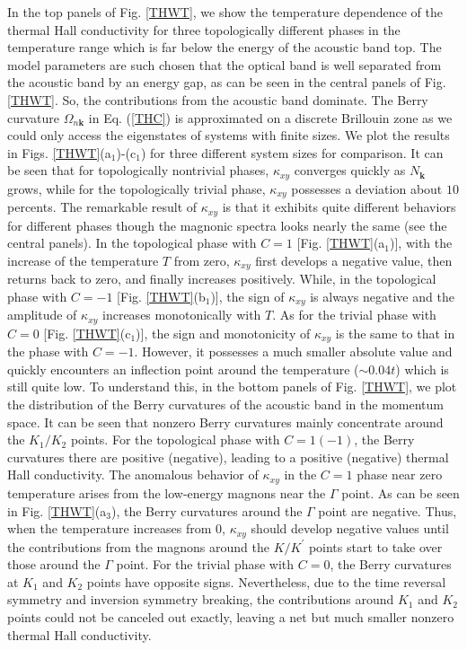 \documentclass[amsmath,superscriptaddress,showpacs,aps,prl,onecolumn,notitlepage]{revtex4-1}
\begin{document}
\par In the top panels of Fig. \ref{THWT}, we show the temperature dependence of the thermal Hall conductivity for three topologically different phases in the temperature range which is far below the energy of the acoustic band top. The model parameters are such chosen that the optical band is well separated from the acoustic band by an energy gap, as can be seen in the central panels of Fig. \ref{THWT}. So, the contributions from the acoustic band dominate. The Berry curvature $\Omega_{n\mathbf{k}}$ in Eq. (\ref{THC}) is approximated on a discrete Brillouin zone as we could only access the eigenstates of systems with finite sizes. We plot the results in Figs. \ref{THWT}(a$_1$)-(c$_1$) for three different system sizes for comparison. It can be seen that for topologically nontrivial phases, $\kappa_{xy}$ converges quickly as $N_{\mathbf{k}}$ grows, while for the topologically trivial phase, $\kappa_{xy}$ possesses a deviation about $10$ percents. The remarkable result of $\kappa_{xy}$ is that it exhibits quite different behaviors for different phases though the magnonic spectra looks nearly the same (see the central panels). In the topological phase with $C=1$ [Fig. \ref{THWT}(a$_1$)], with the increase of the temperature $T$ from zero, $\kappa_{xy}$ first develops a negative value, then returns back to zero, and finally increases positively. While, in the topological phase with $C=-1$ [Fig. \ref{THWT}(b$_1$)], the sign of $\kappa_{xy}$ is always negative and the amplitude of $\kappa_{xy}$ increases monotonically with $T$. As for the trivial phase with $C=0$ [Fig. \ref{THWT}(c$_1$)], the sign and monotonicity of $\kappa_{xy}$ is the same to that in the phase with $C=-1$. However, it possesses a much smaller absolute value and quickly encounters an inflection point around the temperature ($\sim0.04t$) which is still quite low. To understand this, in the bottom panels of Fig. \ref{THWT}, we plot the distribution of the Berry curvatures of the acoustic band in the momentum space. It can be seen that nonzero Berry curvatures mainly concentrate around the $K_1/K_2$ points. For the topological phase with $C=1(-1)$, the Berry curvatures there are positive (negative), leading to a positive (negative) thermal Hall conductivity. The anomalous behavior of $\kappa_{xy}$ in the $C=1$ phase near zero temperature arises from the low-energy magnons near the $\Gamma$ point. As can be seen in Fig. \ref{THWT}(a$_3$), the Berry curvatures around the $\Gamma$ point are negative. Thus, when the temperature increases from $0$, $\kappa_{xy}$ should develop negative values until the contributions from the magnons around the $K/K^\prime$ points start to take over those around the $\Gamma$ point. For the trivial phase with $C=0$, the Berry curvatures at $K_1$ and $K_2$ points have opposite signs. Nevertheless, due to the time reversal symmetry and inversion symmetry breaking, the contributions around $K_1$ and $K_2$ points could not be canceled out exactly, leaving a net but much smaller nonzero thermal Hall conductivity.
\end{document}
